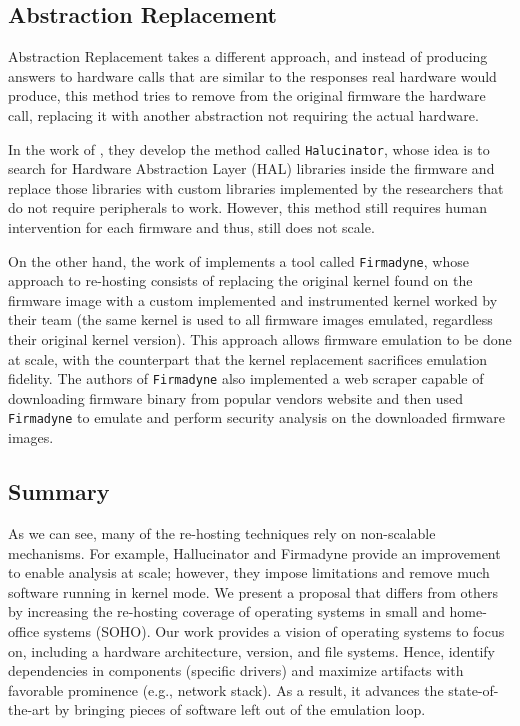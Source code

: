 \documentclass[12pt]{article}
\begin{document}
\subsection{Abstraction Replacement}

Abstraction Replacement takes a different approach, and instead of producing answers to hardware calls that are similar to the responses real hardware would produce, this method tries to remove from the original firmware the hardware call, replacing it with another abstraction not requiring the actual hardware.

In the work of \cite{halucinator}, they develop the method called {\tt Halucinator}, whose idea is to search for Hardware Abstraction Layer (HAL) libraries inside the firmware and replace those libraries with custom libraries implemented by the researchers that do not require peripherals to work. However, this method still requires human intervention for each firmware and thus, still does not scale.

On the other hand, the work of \cite{firmadyne} implements a tool called {\tt Firmadyne}, whose approach to re-hosting consists of replacing the original kernel found on the firmware image with a custom implemented and instrumented kernel worked by their team (the same kernel is used to all firmware images emulated, regardless their original kernel version). This approach allows firmware emulation to be done at scale, with the counterpart that the kernel replacement sacrifices emulation fidelity. The authors of {\tt Firmadyne} also implemented a web scraper capable of downloading firmware binary from popular vendors website and then used {\tt Firmadyne} to emulate and perform security analysis on the downloaded firmware images. %


\subsection{Summary}

As we can see, many of the re-hosting techniques rely on non-scalable mechanisms. For example, Hallucinator and Firmadyne provide an improvement to enable analysis at scale; however, they impose limitations and remove much software running in kernel mode.  We present a proposal that differs from others by increasing the re-hosting coverage of operating systems in small and home-office systems (SOHO).  Our work provides a vision of operating systems to focus on, including a hardware architecture, version, and file systems.  Hence, identify dependencies in components (specific drivers) and maximize artifacts with favorable prominence (e.g., network stack).  As a result, it advances the state-of-the-art by bringing pieces of software left out of the emulation loop.
\end{document}
